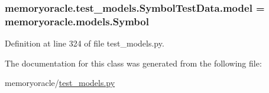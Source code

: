 \subsubsection[{model}]{\setlength{\rightskip}{0pt plus 5cm}memoryoracle.\+test\+\_\+models.\+Symbol\+Test\+Data.\+model = {\bf memoryoracle.\+models.\+Symbol}\hspace{0.3cm}{\ttfamily [static]}}\label{classmemoryoracle_1_1test__models_1_1SymbolTestData_a826f1c1d428e181ce79166814bf29c79}


Definition at line 324 of file test\+\_\+models.\+py.



The documentation for this class was generated from the following file\+:\begin{DoxyCompactItemize}
\item 
memoryoracle/\hyperlink{test__models_8py}{test\+\_\+models.\+py}\end{DoxyCompactItemize}
